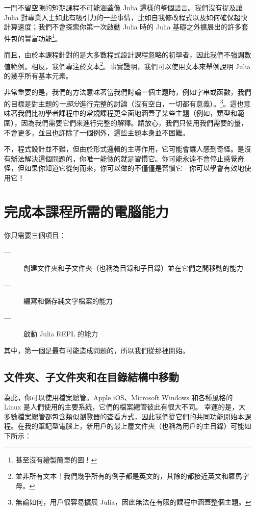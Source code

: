 \documentclass[]{article}
\begin{document}
一門不留空隙的短期課程不可能涵蓋像 Julia 這樣的整個語言。我們沒有提及讓 Julia 對專業人士如此有吸引力的一些事情，比如自我修改程式以及如何確保超快計算速度；我們不會探索你第一次啟動 Julia 時的 Julia 基礎之外擴展出的許多套件包的豐富功能\footnote{甚至沒有繪製簡單的圖！}。

而且，由於本課程針對的是大多數程式設計課程忽略的初學者，因此我們不強調數值範例。相反，我們專注於文本\footnote{並非所有文本！我們幾乎所有的例子都是英文的，其餘的都接近英文和羅馬字母。}。事實證明，我們可以使用文本來舉例說明 Julia 的幾乎所有基本元素。

非常重要的是，我們的方法意味著當我們討論一個主題時，例如字串或函數，我們的目標是對主題的\emph{一部分}進行完整的討論（沒有空白，一切都有意義）。\footnote{無論如何，用戶很容易擴展 Julia，因此無法在有限的課程中涵蓋整個主題。}。這也意味著我們比初學者課程中的常規課程更全面地涵蓋了某些主題（例如，類型和範圍），因為我們需要它們來進行完整的解釋。請放心，我們只使用我們需要的量，不會更多，並且也許除了一個例外，這些主題本身並不困難。

不，程式設計並不難，但由於形式邏輯的主導作用，它可能會讓人感到奇怪。是沒有辦法解決這個問題的，你唯一能做的就是習慣它。你可能永遠不會停止感覺奇怪，但如果你知道它從何而來，你可以做的不僅僅是習慣它---你可以學會有效地使用它！

\section*{完成本課程所需的電腦能力}

你只需要三個項目：

\begin{description}
	\item[---] 創建文件夾和子文件夾（也稱為目錄和子目錄）並在它們之間移動的能力
	\item[---] 編寫和儲存純文字檔案的能力
	\item[---] 啟動 Julia REPL 的能力
\end{description}

其中，第一個是最有可能造成問題的，所以我們從那裡開始。

\subsection*{文件夾、子文件夾和在目錄結構中移動}

為此，你可以使用檔案總管。Apple iOS、Microsoft Windows 和各種風格的 Linux 是人們使用的主要系統，它們的檔案總管彼此有很大不同。
幸運的是，大多數檔案總管都包含類似瀏覽器的查看方式，因此我們從它們的共同功能開始本課程。在我的筆記型電腦上，新用戶的最上層文件夾（也稱為用戶的主目錄）可能如下所示：
\end{document}
